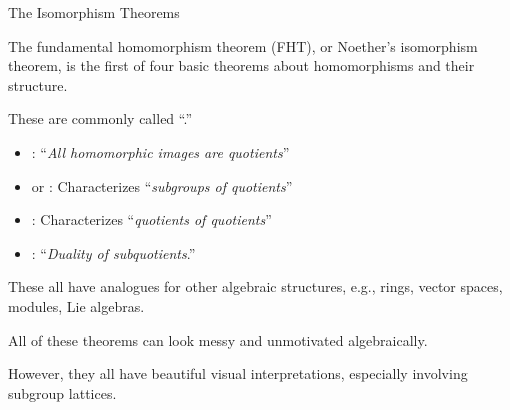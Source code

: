 \documentclass[8pt, handout]{beamer}
\newcommand{\Pause}{}      %
\begin{document}
\begin{frame}{The Isomorphism Theorems}
  
  The fundamental homomorphism theorem (FHT), or Noether's isomorphism theorem, is the first of four
  basic theorems about homomorphisms and their structure. 
  
  \bigskip\Pause
  
  These are commonly called ``.''   \smallskip\Pause
  
  \begin{itemize}
  \item {}: ``\emph{All homomorphic images are quotients}''  \smallskip\Pause
  \item {} or : Characterizes ``\emph{subgroups of quotients}'' \smallskip\Pause
  \item {}: Characterizes ``\emph{quotients of quotients}'' \smallskip\Pause
  \item {}: ``\emph{Duality of subquotients}.'' \smallskip\Pause
  \end{itemize}
  
  These all have analogues for other algebraic structures, e.g.,
  rings, vector spaces, modules, Lie algebras.
  
  \bigskip\Pause
  
  All of these theorems can look messy and unmotivated algebraically.
  
  \bigskip\Pause
  
  However, they all have beautiful visual interpretations, especially
  involving subgroup lattices.
  
\end{frame}

\end{document}
